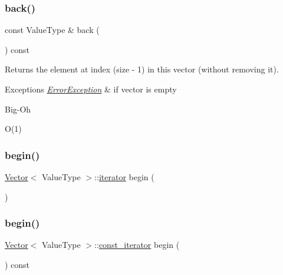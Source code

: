 \subsubsection{\texorpdfstring{back()}{back()}\hspace{0.1cm}{\footnotesize\ttfamily [2/2]}}
{\footnotesize\ttfamily const Value\+Type \& back (\begin{DoxyParamCaption}{ }\end{DoxyParamCaption}) const}



Returns the element at index (size -\/ 1) in this vector (without removing it). 


\begin{DoxyExceptions}{Exceptions}
{\em \mbox{\hyperlink{classErrorException}{Error\+Exception}}} & if vector is empty \\
\hline
\end{DoxyExceptions}
\begin{DoxyRefDesc}{Big-\/\+Oh}
\item[\mbox{\hyperlink{BigOh__BigOh000106}{Big-\/\+Oh}}]O(1) \end{DoxyRefDesc}
\mbox{\label{classVector_aaba614c33559b8e311d00a84e2a68fb6}} 
\subsubsection{\texorpdfstring{begin()}{begin()}\hspace{0.1cm}{\footnotesize\ttfamily [1/2]}}
{\footnotesize\ttfamily \mbox{\hyperlink{classVector}{Vector}}$<$ Value\+Type $>$\+::\mbox{\hyperlink{classVector_aa8cbadd6807ea71ae7465ef4793a6866}{iterator}} begin (\begin{DoxyParamCaption}{ }\end{DoxyParamCaption})}

\mbox{\label{classVector_a906b1e081acafd8fd70dd152d41e7b88}} 
\subsubsection{\texorpdfstring{begin()}{begin()}\hspace{0.1cm}{\footnotesize\ttfamily [2/2]}}
{\footnotesize\ttfamily \mbox{\hyperlink{classVector}{Vector}}$<$ Value\+Type $>$\+::\mbox{\hyperlink{classVector_aa1fbc80673e1a5d9661a77e20836b8d8}{const\+\_\+iterator}} begin (\begin{DoxyParamCaption}{ }\end{DoxyParamCaption}) const}

